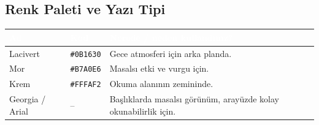 \documentclass[12pt,a4paper]{article}
\begin{document}
\subsection{Renk Paleti ve Yazı Tipi}
\begin{center}
\begin{tabular}{@{}llP{6.4cm}@{}}
\toprule
{}\textcolor{white}{\textbf{Ad}} & \textcolor{white}{\textbf{Kod}} & \textcolor{white}{\textbf{Nerede / neden kullandınız?}} \\
\midrule
Lacivert & \texttt{\#0B1630} & Gece atmosferi için arka planda. \\
Mor & \texttt{\#B7A0E6} & Masalsı etki ve vurgu için. \\
Krem & \texttt{\#FFFAF2} & Okuma alanının zemininde. \\
Georgia / Arial & -- & Başlıklarda masalsı görünüm, arayüzde kolay okunabilirlik için. \\
\bottomrule
\end{tabular}
\end{center}
\end{document}
